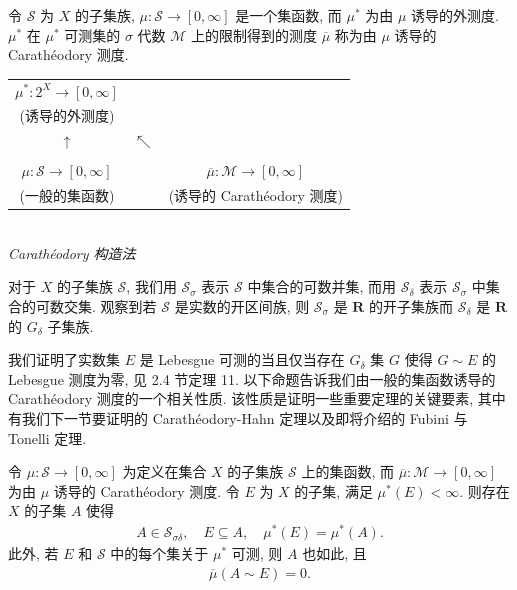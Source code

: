 \documentclass[../../main.tex]{subfiles}
\begin{document}
\begin{definition}\label{definition:ch17-induced-measure}
令 $\mathcal{S}$ 为 $X$ 的子集族, $\mu:\mathcal{S}\to[0,\infty]$ 是一个集函数, 而 $\mu^*$ 为由 $\mu$ 诱导的外测度. $\mu^*$ 在 $\mu^*$ 可测集的 $\sigma$ 代数 $\mathcal{M}$ 上的限制得到的测度 $\overline{\mu}$ 称为由 $\mu$ 诱导的 Carath\'eodory 测度.
\end{definition}

\begin{center}
\begin{tabular}{ccc}
$\mu^*:2^{X}\to[0,\infty]$ & & \\
(诱导的外测度) & & \\
$\uparrow$ & $\nwarrow$ & \\
& & \\
$\mu:\mathcal{S}\to[0,\infty]$ & & $\overline{\mu}:\mathcal{M}\to[0,\infty]$ \\
(一般的集函数) & & (诱导的 Carath\'eodory 测度) \\
\end{tabular}\\
{\it Carath\'eodory 构造法}
\end{center}

对于 $X$ 的子集族 $\mathcal{S}$, 我们用 $\mathcal{S}_{\sigma}$ 表示 $\mathcal{S}$ 中集合的可数并集, 而用 $\mathcal{S}_{\delta}$ 表示 $\mathcal{S}_{\sigma}$ 中集合的可数交集. 观察到若 $\mathcal{S}$ 是实数的开区间族, 则 $\mathcal{S}_{\sigma}$ 是 $\mathbf{R}$ 的开子集族而 $\mathcal{S}_{\delta}$ 是 $\mathbf{R}$ 的 $G_{\delta}$ 子集族.

我们证明了实数集 $E$ 是 Lebesgue 可测的当且仅当存在 $G_{\delta}$ 集 $G$ 使得 $G\sim E$ 的 Lebesgue 测度为零, 见 2.4 节定理 11. 以下命题告诉我们由一般的集函数诱导的 Carath\'eodory 测度的一个相关性质. 该性质是证明一些重要定理的关键要素, 其中有我们下一节要证明的 Carath\'eodory-Hahn 定理以及即将介绍的 Fubini 与 Tonelli 定理.

\begin{proposition}\label{proposition:ch17-gdelta-approximation}
令 $\mu:\mathcal{S}\to[0,\infty]$ 为定义在集合 $X$ 的子集族 $\mathcal{S}$ 上的集函数, 而 $\overline{\mu}:\mathcal{M}\to[0,\infty]$ 为由 $\mu$ 诱导的 Carath\'eodory 测度. 令 $E$ 为 $X$ 的子集, 满足 $\mu^*(E)<\infty$. 则存在 $X$ 的子集 $A$ 使得
\begin{align*}
A\in\mathcal{S}_{\sigma\delta},\quad E\subseteq A,\quad \mu^*(E)=\mu^*(A).
\end{align*}
此外, 若 $E$ 和 $\mathcal{S}$ 中的每个集关于 $\mu^*$ 可测, 则 $A$ 也如此, 且
\begin{align*}
\overline{\mu}(A\sim E)=0.
\end{align*}
\end{proposition}
\end{document}
